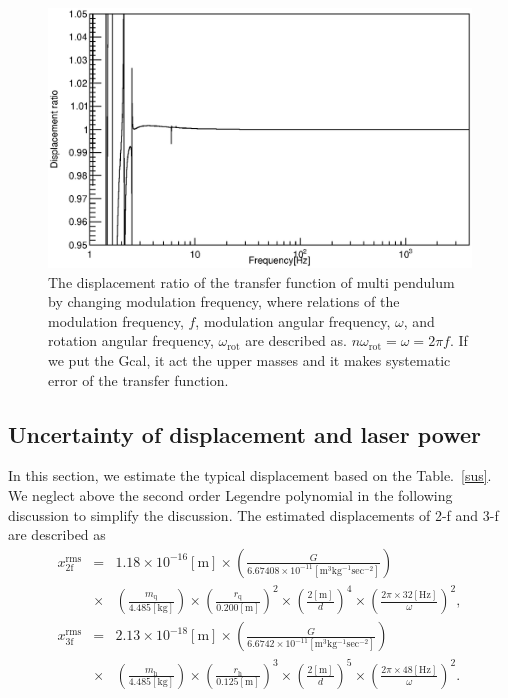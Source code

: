 \documentclass[A4]{spie}  %
\begin{document}
\begin{figure}
\begin{center}
\includegraphics[width=12cm]{dx_Gcal_ratio.eps}
\caption{The displacement ratio of the transfer function of multi pendulum by changing modulation frequency, where relations of the modulation frequency, $f$, modulation angular frequency, $\omega$, and rotation angular frequency, $\omega_{\mathrm{rot}}$ are described as. $n\omega_{\mathrm{rot}}=\omega=2\pi f$. If we put the Gcal, it act the upper masses and it makes systematic error of the transfer function.}
\label{fig:ratio}
\end{center}
\end{figure}

\subsection{Uncertainty of displacement and  laser power}
In this section, we estimate the typical displacement based on the Table.~\ref{sus}. We neglect above the second order Legendre polynomial in the following discussion to simplify the discussion. 
 The estimated displacements of 2-f and 3-f are described as
 \footnotesize
\begin{eqnarray}
x^{\mathrm{rms}}_{\mathrm{2f}}&=&1.18 \times 10^{-16}\mathrm{[m]} \times \left( \frac{G}{6.67408 \times 10^{-11} \mathrm{[m^3kg^{-1}sec^{-2}]}} \right) \nonumber \\
&\times&\! \left( \! \frac{m_{\mathrm{q}}}{4.485 \mathrm{[kg]}} \!\right) \! \times \!\left( \!\frac{r_{\mathrm{q}}}{0.200 \mathrm{[m]}} \! \right)^2 \! \times \! \left( \! \frac{2\mathrm{[m]}}{d} \! \right)^4 \! \times \! \left( \! \frac{2\pi \! \times \! 32\mathrm{[Hz]}}{\omega} \! \right)^2,\\
x^{\mathrm{rms}}_{\mathrm{3f}}&=&2.13 \times 10^{-18}\mathrm{[m]} \times \left( \frac{G}{6.6742 \times 10^{-11} \mathrm{[m^3kg^{-1}sec^{-2}]}} \right) \nonumber \\
&\times& \! \left( \! \frac{m_{\mathrm{h}}}{4.485 \mathrm{[kg]}}\! \right) \! \times \! \left(  \!\frac{r_{\mathrm{h}}}{0.125 \mathrm{[m]}} \! \right)^3 
\! \times \! \left(\! \frac{2\mathrm{[m]}}{d} \! \right)^5 \! \times \! \left( \! \frac{2\pi\!\times \! 48\mathrm{[Hz]}}{\omega} \! \right)^2.
\end{eqnarray}
\normalsize
\end{document}

